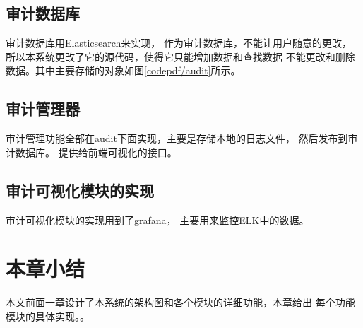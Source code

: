 \subsection{审计数据库}
审计数据库用Elasticsearch来实现，
作为审计数据库，不能让用户随意的更改，
所以本系统更改了它的源代码，使得它只能增加数据和查找数据
不能更改和删除数据。其中主要存储的对象如图\ref{codepdf/audit}所示。
\subsection{审计管理器}
审计管理功能全部在audit下面实现，主要是存储本地的日志文件，
然后发布到审计数据库。
提供给前端可视化的接口。
\subsection{审计可视化模块的实现}
审计可视化模块的实现用到了grafana，
主要用来监控ELK中的数据。
\section{本章小结}
本文前面一章设计了本系统的架构图和各个模块的详细功能，本章给出
每个功能模块的具体实现。。
